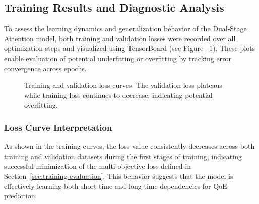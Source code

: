 \subsection{Training Results and Diagnostic Analysis}

To assess the learning dynamics and generalization behavior of the Dual-Stage Attention model, both training and validation losses were recorded over all optimization steps and visualized using TensorBoard (see Figure ~\ref{fig:loss_curves}). These plots enable evaluation of potential underfitting or overfitting by tracking error convergence across epochs.

\begin{figure}[htbp]
  \centering
  \caption{Training and validation loss curves. The validation loss plateaus while training loss continues to decrease, indicating potential overfitting.}
  \label{fig:loss_curves}
\end{figure}

\subsubsection{Loss Curve Interpretation}
As shown in the training curves, the loss value consistently decreases across both training and validation datasets during the first stages of training, indicating successful minimization of the multi-objective loss defined in Section~\ref{sec:training-evaluation}. This behavior suggests that the model is effectively learning both short-time and long-time dependencies for QoE prediction.

